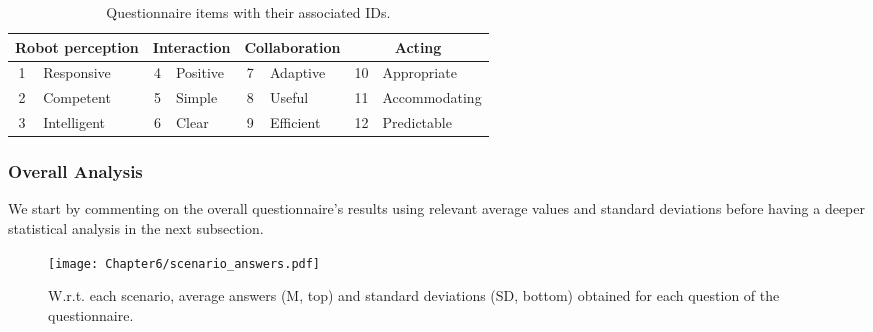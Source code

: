 \begin{table}[h]
    \center
    \begin{tabular}{|cl|cl|cl|cl|}
    \hline
    \multicolumn{2}{|c|}{\textbf{Robot perception}} & \multicolumn{2}{c|}{\textbf{Interaction}} & \multicolumn{2}{c|}{\textbf{Collaboration}} & \multicolumn{2}{c|}{\textbf{Acting}} \\ \hline
    1                 & Responsive                  & 4                & Positive               & 7                & Adaptive                 & 10          & Appropriate            \\ \hline
    2                 & Competent                   & 5                & Simple                 & 8                & Useful                   & 11          & Accommodating          \\ \hline
    3                 & Intelligent                 & 6                & Clear                  & 9                & Efficient                & 12          & Predictable            \\ \hline
    \end{tabular}
    \caption{Questionnaire items with their associated IDs.}
    \label{tab:items_id}
    \end{table}


\subsubsection{Overall Analysis}

We start by commenting on the overall questionnaire's results using relevant average values and standard deviations before having a deeper statistical analysis in the next subsection.

\begin{figure}[h]
    \center
    \texttt{[image: Chapter6/scenario\_answers.pdf]}
    \caption{W.r.t. each scenario, average answers (M, top) and standard deviations (SD, bottom) obtained for each question of the questionnaire.}
    \label{fig:scenario_answers}
\end{figure}

